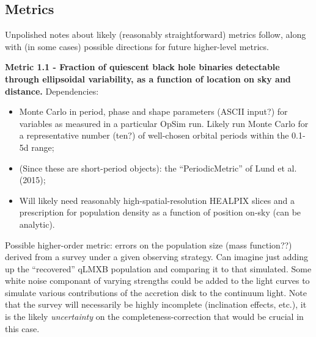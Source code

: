 
\subsection{Metrics}
\label{sec:keyword:MW_Disk_metrics}


Unpolished notes about likely (reasonably straightforward) metrics
follow, along with (in some cases) possible directions for future
higher-level metrics.  


{\bf Metric 1.1 - Fraction of quiescent
  black hole binaries detectable through ellipsoidal variability, as a function of location on sky and distance.}
Dependencies:
\begin{itemize}
  \item Monte Carlo in period, phase and shape parameters (ASCII input?) for variables as measured in a particular OpSim run. Likely run Monte Carlo for a representative number (ten?) of well-chosen orbital periods within the 0.1-5d range;
  \item (Since these are short-period objects): the ``PeriodicMetric'' of Lund et al. (2015);
  \item Will likely need reasonably high-spatial-resolution HEALPIX slices and a prescription for population density as a function of position on-sky (can be analytic).
\end{itemize}
Possible higher-order metric: errors on the population size (mass
function??) derived from a survey under a given observing
strategy. Can imagine just adding up the ``recovered'' qLMXB
population and comparing it to that simulated. Some white noise componant of varying strengths could be
added to the light curves to simulate various contributions of the accretion disk to the continuum light. 
Note that the survey will necessarily be highly incomplete (inclination effects, etc.), it
is the likely {\it uncertainty} on the completeness-correction that
would be crucial in this case. 

